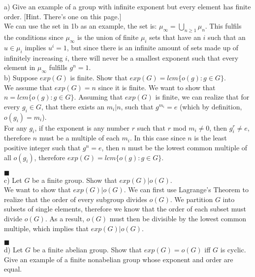 \documentclass[20pt]{article}
\begin{document}
\begin{text}
    a) Give an example of a group with infinite exponent but every element has finite order. [Hint. There’s one on this page.]\\
    
    We can use the set in 1b as an example, the set is: $\mu_{\infty} = \bigcup_{n \geq 1}\mu_{n}$. This fulfils the conditions since $\mu_{\infty}$ is the union of finite $\mu_i$ sets that have an $i$ such that an $u \in \mu_i$ implies $u^i = 1$, but since there is an infinite amount of sets made up of infinitely increasing $i$, there will never be a smallest exponent such that every element in $\mu_{\infty}$ fulfills $g^n = 1$.\\
    
    \noindent
    b) Suppose $exp(G)$ is finite. Show that $exp(G) = lcm\{o(g) : g \in G\}$.\\
    
    We assume that $exp(G) = n$ since it is finite. We want to show that $n = lcm\{o(g) : g \in G\}$. Assuming that $exp(G)$ is finite, we can realize that for every $g_i \in G$, that there exists an $m_i | n$, such that $g^{m_i} = e$ (which by definition, $o(g_i) = m_i$).\\
    
    For any $g_i$, if the exponent is any number $r$ such that $r$ mod $m_i \neq 0$, then $g_i^{r} \neq e$, therefore $n$ must be a multiple of each $m_i$. In this case since $n$ is the least positive integer such that $g^n = e$, then $n$ must be the lowest common multiple of all $o(g_i)$, therefore $exp(G) = lcm\{o(g) : g \in G\}$.
    
    \hfill $\blacksquare$\\
    
    \noindent
    c) Let $G$ be a finite group. Show that $exp(G) | o(G)$.\\
    
    We want to show that $exp(G) | o(G)$. We can first use Lagrange's Theorem to realize that the order of every subgroup divides $o(G)$. We partition $G$ into subsets of single elements, therefore we know that the order of each subset must divide $o(G)$. As a result, $o(G)$ must then be divisible by the lowest common multiple, which implies that $exp(G) | o(G)$.
    
    \hfill $\blacksquare$\\

    \noindent
    d) Let $G$ be a finite abelian group. Show that $exp(G) = o(G)$ iff $G$ is cyclic. Give an example of a finite nonabelian group whose exponent and order are equal.\\
    

\end{text}
\end{document}
